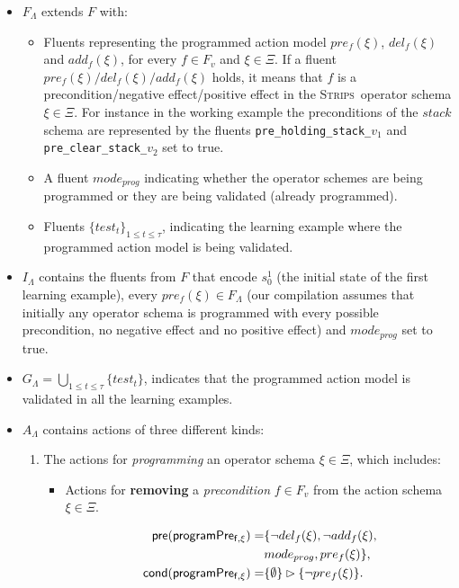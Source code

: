 \documentclass[letterpaper]{article} %
\newcommand{\pre}{\mathsf{pre}}     %
\newcommand{\cond}{\mathsf{cond}}   %
\newcommand{\strips}{\textsc{Strips}}     %
\begin{document}
\begin{itemize}
\item $F_{\Lambda}$ extends $F$ with:
\begin{itemize}
\item Fluents representing the programmed action model $pre_f(\xi)$, $del_f(\xi)$ and $add_f(\xi)$, for every $f\in F_v$ and $\xi \in \Xi$. If a fluent $pre_f(\xi)/del_f(\xi)/add_f(\xi)$ holds, it means that $f$ is a precondition/negative effect/positive effect in the \strips\ operator schema $\xi\in \Xi$. For instance in the working example the preconditions of the $stack$ schema are represented by the fluents {\small\tt pre\_holding\_stack\_$v_1$} and {\small\tt pre\_clear\_stack\_$v_2$} set to true. 
\item A fluent $mode_{prog}$ indicating whether the operator schemes are being programmed or they are being validated (already programmed).
\item Fluents $\{test_t\}_{1\leq t\leq \tau}$, indicating the learning example where the programmed action model is being validated.
\end{itemize}
\item $I_{\Lambda}$ contains the fluents from $F$ that encode $s_0^1$ (the initial state of the first learning example), every $pre_f(\xi)\in F_{\Lambda}$ (our compilation assumes that initially any operator schema is programmed with every possible precondition, no negative effect and no positive effect) and $mode_{prog}$ set to true.
\item $G_{\Lambda}=\bigcup_{1\leq t\leq \tau}\{test_t\}$, indicates that the programmed action model is validated in all the learning examples.
\item $A_{\Lambda}$ contains actions of three different kinds:
\begin{enumerate}
\item The actions for {\em programming} an operator schema $\xi\in\Xi$, which includes:
\begin{itemize}
\item Actions for {\bf removing} a {\em precondition} $f\in F_v$ from the action schema $\xi\in\Xi$.

\begin{small}
\begin{align*}
\hspace*{7pt}\pre(\mathsf{programPre_{f,\xi}})=&\{\neg del_{f}(\xi),\neg add_{f}(\xi),\\
& mode_{prog}, pre_{f}(\xi)\},\\
\cond(\mathsf{programPre_{f,\xi}})=&\{\emptyset\}\rhd\{\neg pre_{f}(\xi)\}.
\end{align*}
\end{small}


\end{itemize}
\end{enumerate}
\end{itemize}
\end{document}
